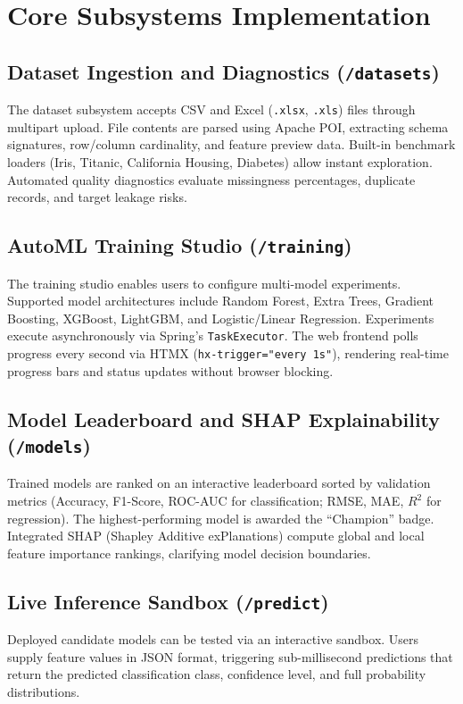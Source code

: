 ﻿\documentclass[11pt,a4paper]{article}
\begin{document}
\section{Core Subsystems Implementation}

\subsection{Dataset Ingestion and Diagnostics (\texttt{/datasets})}
The dataset subsystem accepts CSV and Excel (\texttt{.xlsx}, \texttt{.xls}) files through multipart upload. File contents are parsed using Apache POI, extracting schema signatures, row/column cardinality, and feature preview data. Built-in benchmark loaders (Iris, Titanic, California Housing, Diabetes) allow instant exploration. Automated quality diagnostics evaluate missingness percentages, duplicate records, and target leakage risks.

\subsection{AutoML Training Studio (\texttt{/training})}
The training studio enables users to configure multi-model experiments. Supported model architectures include Random Forest, Extra Trees, Gradient Boosting, XGBoost, LightGBM, and Logistic/Linear Regression. Experiments execute asynchronously via Spring's \texttt{TaskExecutor}. The web frontend polls progress every second via HTMX (\texttt{hx-trigger="every 1s"}), rendering real-time progress bars and status updates without browser blocking.

\subsection{Model Leaderboard and SHAP Explainability (\texttt{/models})}
Trained models are ranked on an interactive leaderboard sorted by validation metrics (Accuracy, F1-Score, ROC-AUC for classification; RMSE, MAE, $R^2$ for regression). The highest-performing model is awarded the ``Champion'' badge. Integrated SHAP (Shapley Additive exPlanations) compute global and local feature importance rankings, clarifying model decision boundaries.

\subsection{Live Inference Sandbox (\texttt{/predict})}
Deployed candidate models can be tested via an interactive sandbox. Users supply feature values in JSON format, triggering sub-millisecond predictions that return the predicted classification class, confidence level, and full probability distributions.
\end{document}
